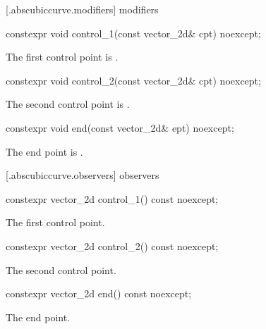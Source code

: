  [\iotwod.abscubiccurve.modifiers]{ modifiers}

%
\begin{itemdecl}
constexpr void control_1(const vector_2d& cpt) noexcept;
\end{itemdecl}
\begin{itemdescr}
\pnum
\effects
The first control point is .
\end{itemdescr}

%
\begin{itemdecl}
constexpr void control_2(const vector_2d& cpt) noexcept;
\end{itemdecl}
\begin{itemdescr}
\pnum
\effects
The second control point is .
\end{itemdescr}

%
\begin{itemdecl}
constexpr void end(const vector_2d& ept) noexcept;
\end{itemdecl}
\begin{itemdescr}
\pnum
\effects
The end point is .
\end{itemdescr}

 [\iotwod.abscubiccurve.observers]{ observers}

%
\begin{itemdecl}
constexpr vector_2d control_1() const noexcept;
\end{itemdecl}
\begin{itemdescr}
\pnum
\returns
The first control point.
\end{itemdescr}

%
\begin{itemdecl}
constexpr vector_2d control_2() const noexcept;
\end{itemdecl}
\begin{itemdescr}
\pnum
\returns
The second control point.
\end{itemdescr}

%
\begin{itemdecl}
constexpr vector_2d end() const noexcept;
\end{itemdecl}
\begin{itemdescr}
\pnum
\returns
The end point.
\end{itemdescr}

